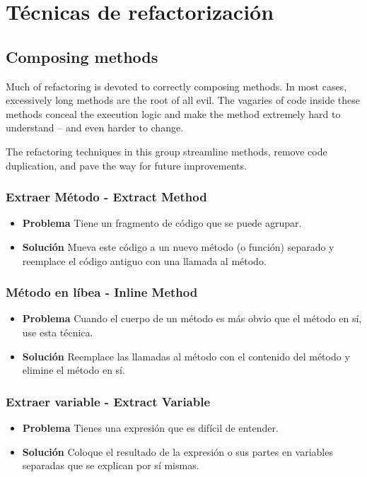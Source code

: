 \documentclass[11pt,a4paper,oneside]{book}
\begin{document}
\chapter{Técnicas de refactorización}


\section{Composing methods}

Much of refactoring is devoted to correctly composing methods. In most cases, excessively long methods are the root of all evil. The vagaries of code inside these methods conceal the execution logic and make the method extremely hard to understand – and even harder to change.

The refactoring techniques in this group streamline methods, remove code duplication, and pave the way for future improvements.

\subsection{Extraer Método  - Extract Method}
\label{extractmethod}
\begin{itemize}
    \item \textbf{Problema} Tiene un fragmento de código que se puede agrupar.
    \item \textbf{Solución} Mueva este código a un nuevo método (o función) separado y reemplace el código antiguo con una llamada al método.
\end{itemize}


    
\subsection{Método en líbea - Inline Method}
\label{inlinemethod}
\begin{itemize}
    \item \textbf{Problema} Cuando el cuerpo de un método es más obvio que el método en sí, use esta técnica.
    \item \textbf{Solución} Reemplace las llamadas al método con el contenido del método y elimine el método en sí.
\end{itemize}



\subsection{Extraer variable - Extract Variable}
\label{extracvariable}
\begin{itemize}
    \item \textbf{Problema} Tienes una expresión que es difícil de entender.
    \item \textbf{Solución} Coloque el resultado de la expresión o sus partes en variables separadas que se explican por sí mismas.
\end{itemize}


    
\end{document}
